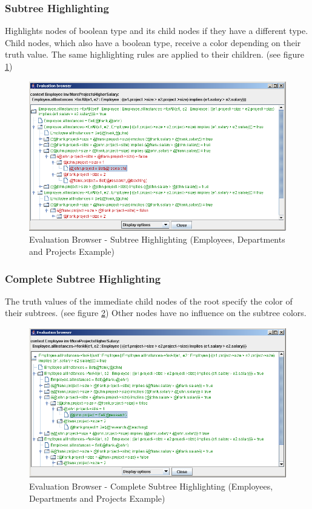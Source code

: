\documentclass[a4paper,titlepage,oneside,final]{scrreprt} %
\begin{document}
\subsubsection{Subtree Highlighting}
Highlights nodes of boolean type and its child nodes if they have a different type.
Child nodes, which also have a boolean type, receive a color depending on their truth value.
The same highlighting rules are applied to their children.
(see figure \ref{fig:EvaluationBrowserSubtreeHighlighting})
\begin{figure}[ht]
\centering
\includegraphics[scale=0.5]{Screenshots/GUI/EvaluationBrowserSubtreeHighlighting.png}
\caption{Evaluation Browser - Subtree Highlighting (Employees, Departments and Projects Example)}
\label{fig:EvaluationBrowserSubtreeHighlighting}
\end{figure}
\subsubsection{Complete Subtree Highlighting}
The truth values of the immediate child nodes of the root specify the color of their subtrees.
(see figure \ref{fig:EvaluationBrowserCompleteHighlighting})
Other nodes have no influence on the subtree colors.
\begin{figure}[ht]
\centering
\includegraphics[scale=0.5]{Screenshots/GUI/EvaluationBrowserCompleteHighlighting.png}
\caption{Evaluation Browser - Complete Subtree Highlighting (Employees, Departments and Projects Example)}
\label{fig:EvaluationBrowserCompleteHighlighting}
\end{figure}
\end{document}
